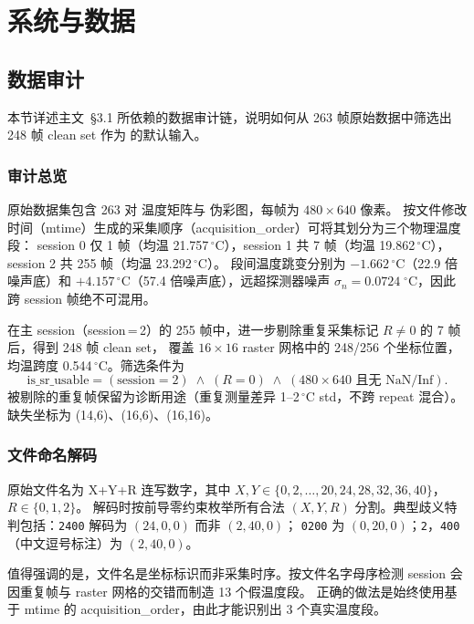 \section{系统与数据}

\subsection{数据审计}

本节详述主文~\S3.1 所依赖的数据审计链，说明如何从 263 帧原始数据中筛选出 248 帧 clean set 作为  的默认输入。

\subsubsection{审计总览}

原始数据集包含 263 对  温度矩阵与  伪彩图，每帧为 \(480 \times 640\) 像素。
按文件修改时间（mtime）生成的采集顺序（acquisition\_order）可将其划分为三个物理温度段：
session 0 仅 1 帧（均温 21.757\,\(^\circ\)C），session 1 共 7 帧（均温 19.862\,\(^\circ\)C），session 2 共 255 帧（均温 23.292\,\(^\circ\)C）。
段间温度跳变分别为 \(-1.662\)\,\(^\circ\)C（22.9 倍噪声底）和 \(+4.157\)\,\(^\circ\)C（57.4 倍噪声底），远超探测器噪声 \(\sigma_n = 0.0724\;^\circ\mathrm{C}\)，因此跨 session 帧绝不可混用。

在主 session（session\,=\,2）的 255 帧中，进一步剔除重复采集标记 \(R \neq 0\) 的 7 帧后，得到 248 帧 clean set，
覆盖 \(16 \times 16\) raster 网格中的 248/256 个坐标位置，均温跨度 0.544\,\(^\circ\)C。筛选条件为
\[
  \text{is\_sr\_usable} = (\text{session} = 2) \;\wedge\; (R = 0) \;\wedge\; (480 \times 640 \text{ 且无 NaN/Inf}).
\]
被剔除的重复帧保留为诊断用途（重复测量差异 1--2\,\(^\circ\)C std，不跨 repeat 混合）。缺失坐标为 (14,6)、(16,6)、(16,16)。

\subsubsection{文件命名解码}

原始文件名为 X+Y+R 连写数字，其中 \(X, Y \in \{0, 2, \ldots, 20, 24, 28, 32, 36, 40\}\)，\(R \in \{0, 1, 2\}\)。
解码时按前导零约束枚举所有合法 \((X, Y, R)\) 分割。典型歧义特判包括：\texttt{2400} 解码为 \((24, 0, 0)\) 而非 \((2, 40, 0)\)；
\texttt{0200} 为 \((0, 20, 0)\)；\texttt{2}，\texttt{400}（中文逗号标注）为 \((2, 40, 0)\)。

值得强调的是，文件名是坐标标识而非采集时序。按文件名字母序检测 session 会因重复帧与 raster 网格的交错而制造 13 个假温度段。
正确的做法是始终使用基于 mtime 的 acquisition\_order，由此才能识别出 3 个真实温度段。

